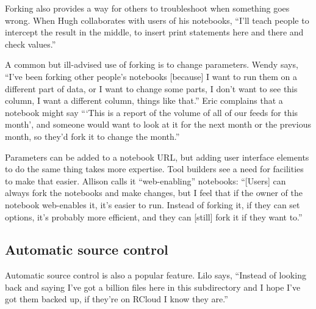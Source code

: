Forking also provides a way for others to troubleshoot when something goes
wrong. When Hugh collaborates with users of his notebooks, ``I'll teach people
to intercept the result in the middle, to insert print statements here and
there and check values.''



A common but ill-advised use of forking is to change
parameters. Wendy says, ``I've been forking other people's notebooks [because] I
want to run them on a different part of data, or I want to change some parts,
I don't want to see this column, I want a different column, things like
that.'' Eric complains that a notebook might say ```This is a report of
the volume of all of our feeds for this month', and someone would want to
look at it for the next month or the previous month, so they'd fork it to
change the month.''

Parameters can be added to a notebook URL, but adding user interface
elements to do the same thing takes more expertise. Tool builders see a
need for facilities to make that easier. Allison calls it ``web-enabling''
notebooks: ``[Users] can always fork the notebooks and make changes, but I
feel that if the owner of the notebook web-enables it, it's easier to
run. Instead of forking it, if they can set options, it's probably more
efficient, and they can [still] fork it if they want to.''


\subsection{Automatic source control}

Automatic source control is also a popular feature. Lilo says, ``Instead of
looking back and saying I've got a billion files here in this subdirectory and I
hope I've got them backed up, if they're on RCloud I know they are.''

